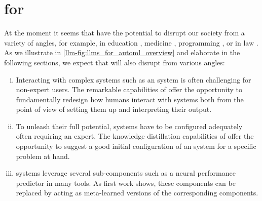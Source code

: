 

\section{\LLMs for \AutoML}
\label{llm-sec:llms-for-automl}


At the moment it seems that \LLMs have the potential to disrupt our society from a variety of angles, for example, in education \cite{kasneci-lid23a}, medicine \cite{alberts-jnmmi23a}, programming \cite{dakhel-jss23a}, or in law \cite{noonan-ssrn23}. As we illustrate in \autoref{llm-fig:llms_for_automl_overview} and elaborate in the following sections, we expect that \LLMs will also disrupt \AutoML from various angles: 

\begin{enumerate}[(i)]
    \item Interacting with complex systems such as an \AutoML system is often challenging for non-expert users. The remarkable \NLP capabilities of \LLMs offer the opportunity to fundamentally redesign how humans interact with \AutoML systems both from the point of view of setting them up and interpreting their output. 
    \item To unleash their full potential, \AutoML systems have to be configured adequately often requiring an expert. The knowledge distillation capabilities of \LLMs offer the opportunity to suggest a good initial configuration of an \AutoML system for a specific problem at hand.
    \item \AutoML systems leverage several sub-components such as a neural performance predictor in many \NAS tools. As first work shows, these components can be replaced by \LLMs acting as meta-learned versions of the corresponding components.
\end{enumerate}

